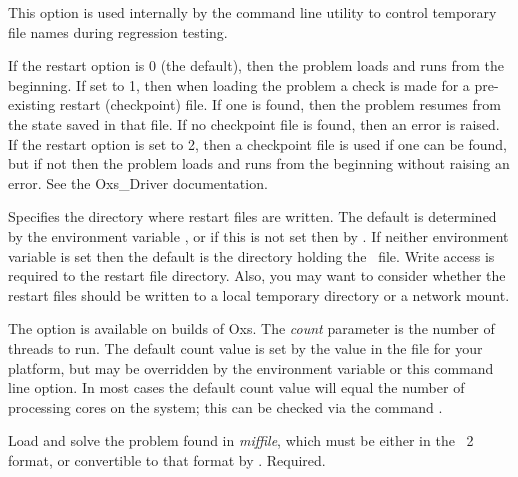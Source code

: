 \begin{description}
  This option is used internally by the
  command line utility to control temporary file names during regression
  testing.
\item[\optkey{-restart \boa 0\pipe 1\pipe 2\bca\index{simulation~3D!restarting}}]
  If the restart option is 0 (the default), then the problem loads and
  runs from the beginning.  If set to 1, then when loading the problem a
  check is made for a pre-existing restart (checkpoint) file.  If one is
  found, then the problem resumes from the state saved in that file.  If
  no checkpoint file is found, then an error is raised.  If the restart
  option is set to 2, then a checkpoint file is used if one can be
  found, but if not then the problem loads and runs from the beginning
  without raising an error.  See the Oxs\_Driver
  documentation.
\item[\optkey{-restartfiledir dir}]
  Specifies the directory where restart files are written.
  The default is determined by the environment variable
  ,
  or if this is not set then by
  .  If
  neither environment variable is set then the default is the
  directory holding the \MIF\ file.  Write access is required to the
  restart file directory.  Also, you may want to consider whether the
  restart files should be written to a local temporary directory or a
  network mount.
\item[\optkey{-threads \boa count\bca}]
  The option is available on  builds of Oxs.  The \textit{count}
  parameter is the number of threads to run.  The default count value is
  set by the  value in
  the  file for your platform, but may be
  overridden by
  the 
  environment variable or this command line option.  In most cases the
  default count value will equal the number of processing cores on the
  system; this can be checked via the command .
\item[\optkey{miffile}]
  Load and solve the problem found in {\em miffile}, which must be
  either in the \MIF~2 format, or convertible to that format by
  .  Required.
\end{description}

